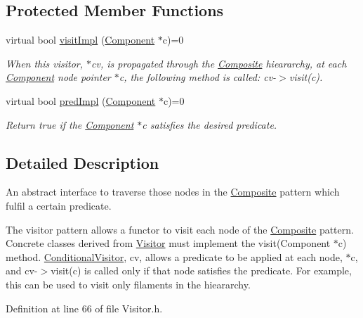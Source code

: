 \subsection*{Protected Member Functions}
\begin{DoxyCompactItemize}
\item 
virtual bool \hyperlink{classchem_1_1ConditionalVisitor_a9147a13599f4da256cb4c306341a617f}{visit\-Impl} (\hyperlink{classchem_1_1Component}{Component} $\ast$c)=0
\begin{DoxyCompactList}\small\item\em When this visitor, $\ast$cv, is propagated through the \hyperlink{classchem_1_1Composite}{Composite} hieararchy, at each \hyperlink{classchem_1_1Component}{Component} node pointer $\ast$c, the following method is called\-: cv-\/$>$visit(c). \end{DoxyCompactList}\item 
virtual bool \hyperlink{classchem_1_1ConditionalVisitor_aedb9fb37d241833c5a2e0ffe1ee1994c}{pred\-Impl} (\hyperlink{classchem_1_1Component}{Component} $\ast$c)=0
\begin{DoxyCompactList}\small\item\em Return true if the \hyperlink{classchem_1_1Component}{Component} $\ast$c satisfies the desired predicate. \end{DoxyCompactList}\end{DoxyCompactItemize}


\subsection{Detailed Description}
An abstract interface to traverse those nodes in the \hyperlink{classchem_1_1Composite}{Composite} pattern which fulfil a certain predicate. 

The visitor pattern allows a functor to visit each node of the \hyperlink{classchem_1_1Composite}{Composite} pattern. Concrete classes derived from \hyperlink{classchem_1_1Visitor}{Visitor} must implement the visit(\-Component $\ast$c) method. \hyperlink{classchem_1_1ConditionalVisitor}{Conditional\-Visitor}, cv, allows a predicate to be applied at each node, $\ast$c, and cv-\/$>$visit(c) is called only if that node satisfies the predicate. For example, this can be used to visit only filaments in the hieararchy. 

Definition at line 66 of file Visitor.\-h.



